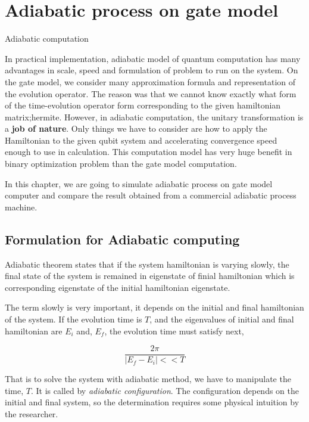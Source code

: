 \chapter{Adiabatic process on gate model}

Adiabatic computation


In practical implementation, adiabatic model of quantum computation
has many advantages in scale, speed and formulation of problem to run on the system.
On the gate model, we consider many approximation formula and representation of the evolution operator. 
The reason was that we cannot know exactly what form of the time-evolution operator form corresponding to the given hamiltonian matrix;hermite. 
However, in adiabatic computation, the unitary transformation is a \textbf{job of nature}. 
Only things we have to consider are how to apply the Hamiltonian to the given qubit system and 
accelerating convergence speed enough to use in calculation.
This computation model has very huge benefit in binary optimization problem than the gate model computation.

In this chapter, we are going to simulate adiabatic
process on gate model computer and compare the result obtained
from a commercial adiabatic process machine.

\section{Formulation for Adiabatic computing}

Adiabatic theorem states that if the system hamiltonian is varying slowly, 
the final state of the system is remained in eigenstate of finial hamiltonian 
which is corresponding eigenstate of the initial hamiltonian eigenstate.

The term slowly is very important, it depends on the initial and final hamiltonian of the system. 
If the evolution time is $T$, and the eigenvalues of initial and final hamiltonian are $E_i$
and, $E_f$, the evolution time must satisfy next,

\begin{equation}
    \frac{2 \pi}{|E_f - E_i| << T}
\end{equation}

That is to solve the system with adiabatic method, we have to manipulate the time, $T$.
It is called by \textit{adiabatic configuration}. 
The configuration depends on the initial and final system, 
so the determination requires some physical intuition by the researcher.

